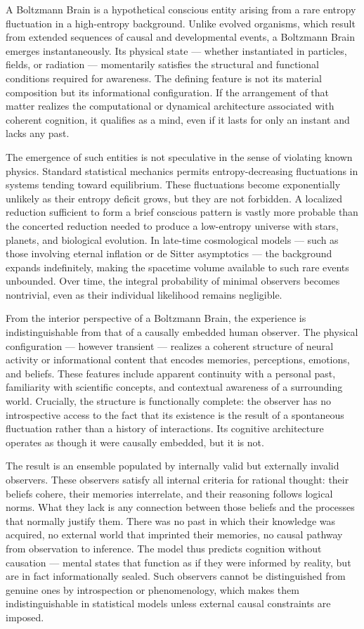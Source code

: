 A Boltzmann Brain is a hypothetical conscious entity arising from a rare entropy fluctuation in a high-entropy background. Unlike evolved organisms, which result from extended sequences of causal and developmental events, a Boltzmann Brain emerges instantaneously. Its physical state — whether instantiated in particles, fields, or radiation — momentarily satisfies the structural and functional conditions required for awareness. The defining feature is not its material composition but its informational configuration. If the arrangement of that matter realizes the computational or dynamical architecture associated with coherent cognition, it qualifies as a mind, even if it lasts for only an instant and lacks any past.

The emergence of such entities is not speculative in the sense of violating known physics. Standard statistical mechanics permits entropy-decreasing fluctuations in systems tending toward equilibrium. These fluctuations become exponentially unlikely as their entropy deficit grows, but they are not forbidden. A localized reduction sufficient to form a brief conscious pattern is vastly more probable than the concerted reduction needed to produce a low-entropy universe with stars, planets, and biological evolution. In late-time cosmological models — such as those involving eternal inflation or de Sitter asymptotics — the background expands indefinitely, making the spacetime volume available to such rare events unbounded. Over time, the integral probability of minimal observers becomes nontrivial, even as their individual likelihood remains negligible.

From the interior perspective of a Boltzmann Brain, the experience is indistinguishable from that of a causally embedded human observer. The physical configuration — however transient — realizes a coherent structure of neural activity or informational content that encodes memories, perceptions, emotions, and beliefs. These features include apparent continuity with a personal past, familiarity with scientific concepts, and contextual awareness of a surrounding world. Crucially, the structure is functionally complete: the observer has no introspective access to the fact that its existence is the result of a spontaneous fluctuation rather than a history of interactions. Its cognitive architecture operates as though it were causally embedded, but it is not.

The result is an ensemble populated by internally valid but externally invalid observers. These observers satisfy all internal criteria for rational thought: their beliefs cohere, their memories interrelate, and their reasoning follows logical norms. What they lack is any connection between those beliefs and the processes that normally justify them. There was no past in which their knowledge was acquired, no external world that imprinted their memories, no causal pathway from observation to inference. The model thus predicts cognition without causation — mental states that function as if they were informed by reality, but are in fact informationally sealed. Such observers cannot be distinguished from genuine ones by introspection or phenomenology, which makes them indistinguishable in statistical models unless external causal constraints are imposed.


